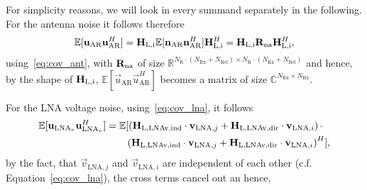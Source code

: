 For simplicity reasons, we will look in every summand separately in the following.
For the antenna noise it follows therefore
\begin{align}
\mathbb{E}[\mathbf{u}_\text{AR}\mathbf{u}_\text{AR}^H] = 
	\mathbf{H}_\text{L,i}\mathbb{E}[\mathbf{n}_\text{AR}\mathbf{n}_\text{AR}^H]\mathbf{H}_\text{L,i}^H 
	= \mathbf{H}_\text{L,i} \mathbf{R}_\text{na} \mathbf{H}_\text{L,i}^H,
\end{align}
using~\eqref{eq:cov_ant}, with $\mathbf{R}_\text{na}$ of size $\mathbb{R}^{ N_\text{R}\cdot\left(N_\text{Rx}+N_\text{Rel}\right)\times N_\text{R}\cdot\left(N_\text{Rx}+N_\text{Rel}\right)}$ and hence, by the shape of $\mathbf{H}_\text{L,i}$, $\mathbb{E}[\vec{u}_\text{AR}\vec{u}_\text{AR}^H]$ becomes a matrix of size $\mathbb{C}^{ N_\text{Rx}\times N_\text{Rx}}$.


For the LNA voltage noise, using~\eqref{eq:cov_lna}, it follows
\begin{align}
\nonumber
\mathbb{E}[\vec{u}_{\text{LNA}_v}\vec{u}_{\text{LNA}_v}^H] &= %
\mathbb{E}[\left(\mat{H}_\text{L,LNAv,ind}\cdot\vec{v}_{\text{LNA},j}+\mat{H}_\text{L,LNAv,dir}\cdot\vec{v}_{\text{LNA},i}\right)\cdot\\
&\qquad\left(\mat{H}_\text{L,LNAv,ind}\cdot\vec{v}_{\text{LNA},j}+\mat{H}_\text{L,LNAv,dir}\cdot\vec{v}_{\text{LNA},i}\right)^H],
\end{align}
by the fact, that $\vec{v}_{\text{LNA},j}$ and $\vec{v}_{\text{LNA},i}$ are independent of each other (c.f. Equation~\eqref{eq:cov_lna}), the cross terms cancel out an hence,
